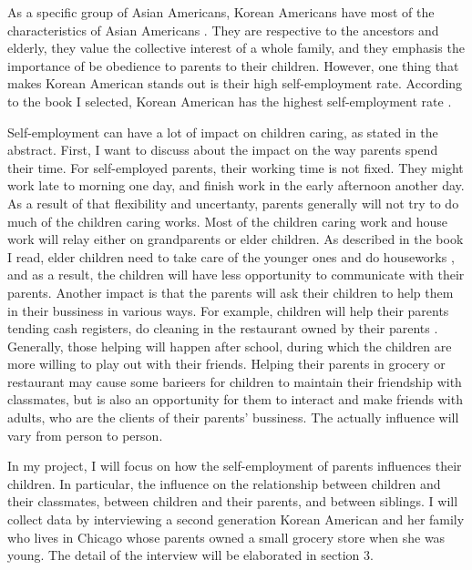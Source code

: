 As a specific group of Asian Americans, Korean Americans have most of the
characteristics of Asian Americans \cite{online:AsianAmericanChar}. They are
respective to the ancestors and elderly, they value the collective interest of a
whole family, and they emphasis the importance of be obedience to parents to
their children. However, one thing that makes Korean American stands out is
their high self-employment rate. According to the book I selected, Korean
American has the highest self-employment
rate \cite[p.~14]{book:ISelected}. 
\par
Self-employment can have a lot of impact on children caring, as stated in the
abstract. First, I want to discuss about the impact on the way parents spend
their time. For self-employed parents, their working time is not fixed. They
might work late to morning one day, and finish work in the early afternoon
another day. As a result of that flexibility and uncertanty, parents generally
will not try to do much of the children caring works. Most of the children
caring work and house work will relay either on grandparents or elder children.
As described in the book I read, elder children need to take care of the younger
ones and do houseworks \cite[p.~22]{book:ISelected}, and as a result, the
children will have less opportunity to communicate with their parents. Another
impact is that the parents will ask their children to help them in their
bussiness in various ways. For example, children
will help their parents tending cash registers, do
cleaning in the restaurant owned by their parents \cite[p.~25]{book:ISelected}.
Generally, those helping will happen after school, during which the children are
more willing to play out with their friends. Helping their parents in grocery or
restaurant may cause some barieers for children to maintain their friendship
with classmates, but is also an opportunity for them to interact and make
friends with adults, who are the clients of their parents' bussiness. The
actually influence will vary from person to person.
\par
In my project, I will focus on how the self-employment of parents influences
their children. In particular, the influence on the relationship between
children and their classmates, between children and their parents, and between
siblings. I will collect data by interviewing a second generation Korean
American and her family who lives in Chicago whose parents owned a small
grocery store when she was young.
The detail of the interview will be elaborated in section 3.
